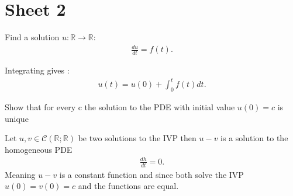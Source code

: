 \section{Sheet 2}
\begin{question}[subtitle=Inhomogeneous Transport Equation (a)]
	Find a solution $u : \mathbb{R} \to  \mathbb{R}$:
  \begin{align*}
    \frac{du}{dt} = f(t)
  .\end{align*}
\end{question}
\begin{solution}
  Integrating gives : 
  \begin{align*}
    u(t) = u(0) + \int_0^{t} f(t) dt 
  .\end{align*}
\end{solution}
\begin{question}[subtitle=Inhomogeneous Transport Equation (b)]
  Show that for every c the solution to the PDE with initial value $u(0) = c$ is unique
\end{question}
\begin{solution}
  Let $u,v \in  \mathcal{C}(\mathbb{R};\mathbb{R})$ be two solutions to the IVP then  $u-v$ is a solution to the homogeneous PDE
 \begin{align*}
  \frac{dh}{dt} = 0
 .\end{align*} 
  Meaning $u-v$ is a constant function and since both solve the IVP $u(0)=v(0)=c$  and the functions are equal. 
\end{solution}

